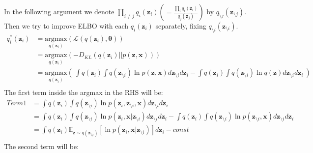 \documentclass[a4]{article}
\begin{document}
In the following argument we denote $\prod_{i\ne j} q_i ( \mathbf{z}_i) (= \frac{\prod_{i}q_i(\mathbf{z}_i)}{q_j(\mathbf{z}_j)})$
by $q_{\setminus j} ( \mathbf{z}_{\setminus j})$.
Then we try to improve ELBO with each $q_i ( \mathbf{z}_i)$ separately, fixing $q_{\setminus i} ( \mathbf{z}_{\setminus i})$.
\begin{equation}
\begin{aligned}
q^*_i(\mathbf{z}_i) &= \underset{q(\mathbf{z}_i)}{\mathrm{argmax}}(\mathcal{L}(q(\mathbf{z}_i), \bm{\theta}))\\
                   &= \underset{q(\mathbf{z}_i)}{\mathrm{argmax}}( - D_{KL}(q(\mathbf{z}_i) || p(\mathbf{z},\mathbf{x})))\\
                   &= \underset{q(\mathbf{z}_i)}{\mathrm{argmax}}(\: \int q(\mathbf{z}_i) \int q(\mathbf{z}_{\setminus i}) \ln p(\mathbf{z},\mathbf{x})d\mathbf{z}_{\setminus i} d\mathbf{z}_i
                    - \int q(\mathbf{z}_i) \int q(\mathbf{z}_{\setminus i}) \ln q(\mathbf{z})d\mathbf{z}_{\setminus i} d\mathbf{z}_i \: )\label{eq_argmax}\\
\end{aligned}
\end{equation}
The first term inside the argmax in the RHS will be:
\begin{equation}
\begin{aligned}
Term 1 &= \int q(\mathbf{z}_i) \int q(\mathbf{z}_{\setminus i}) \ln p(\mathbf{z}_i, \mathbf{z}_{\setminus i}, \mathbf{x})d\mathbf{z}_{\setminus i} d\mathbf{z}_i\\
       &= \int q(\mathbf{z}_i) \int q(\mathbf{z}_{\setminus i}) \ln p(\mathbf{z}_i, \mathbf{x} | \mathbf{z}_{\setminus i})d\mathbf{z}_{\setminus i} d\mathbf{z}_i
        - \int q(\mathbf{z}_i) \int q(\mathbf{z}_{\setminus i}) \ln p(\mathbf{z}_{\setminus i}, \mathbf{x})d\mathbf{z}_{\setminus i} d\mathbf{z}_i\\
       &= \int q(\mathbf{z}_i) \mathbb{E}_{\mathbf{z}\sim q(\mathbf{z}_{\setminus i})}[ \ln p(\mathbf{z}_i, \mathbf{x} | \mathbf{z}_{\setminus i}) ] d\mathbf{z}_i - const\label{eq_term1}\\
\end{aligned}
\end{equation}
The second term will be:
\end{document}
